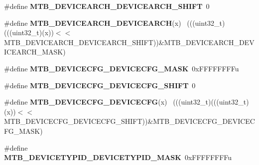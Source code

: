 \begin{DoxyCompactItemize}
\item 
\hypertarget{group___m_t_b___register___masks_ga80261ce3e90659fbc1f5c9e2dd2867f8}{}\#define {\bfseries M\+T\+B\+\_\+\+D\+E\+V\+I\+C\+E\+A\+R\+C\+H\+\_\+\+D\+E\+V\+I\+C\+E\+A\+R\+C\+H\+\_\+\+S\+H\+I\+F\+T}~0\label{group___m_t_b___register___masks_ga80261ce3e90659fbc1f5c9e2dd2867f8}

\item 
\hypertarget{group___m_t_b___register___masks_gaa0a369a22afd89955eb3635f56a1d7e4}{}\#define {\bfseries M\+T\+B\+\_\+\+D\+E\+V\+I\+C\+E\+A\+R\+C\+H\+\_\+\+D\+E\+V\+I\+C\+E\+A\+R\+C\+H}(x)                      ~(((uint32\+\_\+t)(((uint32\+\_\+t)(x))$<$$<$M\+T\+B\+\_\+\+D\+E\+V\+I\+C\+E\+A\+R\+C\+H\+\_\+\+D\+E\+V\+I\+C\+E\+A\+R\+C\+H\+\_\+\+S\+H\+I\+F\+T))\&M\+T\+B\+\_\+\+D\+E\+V\+I\+C\+E\+A\+R\+C\+H\+\_\+\+D\+E\+V\+I\+C\+E\+A\+R\+C\+H\+\_\+\+M\+A\+S\+K)\label{group___m_t_b___register___masks_gaa0a369a22afd89955eb3635f56a1d7e4}

\item 
\hypertarget{group___m_t_b___register___masks_ga5d8dec4596fd0f32f4b71f1fbfb71aee}{}\#define {\bfseries M\+T\+B\+\_\+\+D\+E\+V\+I\+C\+E\+C\+F\+G\+\_\+\+D\+E\+V\+I\+C\+E\+C\+F\+G\+\_\+\+M\+A\+S\+K}~0x\+F\+F\+F\+F\+F\+F\+F\+Fu\label{group___m_t_b___register___masks_ga5d8dec4596fd0f32f4b71f1fbfb71aee}

\item 
\hypertarget{group___m_t_b___register___masks_gac42900c87a48c38d0b310cbeb8781c81}{}\#define {\bfseries M\+T\+B\+\_\+\+D\+E\+V\+I\+C\+E\+C\+F\+G\+\_\+\+D\+E\+V\+I\+C\+E\+C\+F\+G\+\_\+\+S\+H\+I\+F\+T}~0\label{group___m_t_b___register___masks_gac42900c87a48c38d0b310cbeb8781c81}

\item 
\hypertarget{group___m_t_b___register___masks_ga10fd88b65b900c08c281f5a8aa886ddd}{}\#define {\bfseries M\+T\+B\+\_\+\+D\+E\+V\+I\+C\+E\+C\+F\+G\+\_\+\+D\+E\+V\+I\+C\+E\+C\+F\+G}(x)                          ~(((uint32\+\_\+t)(((uint32\+\_\+t)(x))$<$$<$M\+T\+B\+\_\+\+D\+E\+V\+I\+C\+E\+C\+F\+G\+\_\+\+D\+E\+V\+I\+C\+E\+C\+F\+G\+\_\+\+S\+H\+I\+F\+T))\&M\+T\+B\+\_\+\+D\+E\+V\+I\+C\+E\+C\+F\+G\+\_\+\+D\+E\+V\+I\+C\+E\+C\+F\+G\+\_\+\+M\+A\+S\+K)\label{group___m_t_b___register___masks_ga10fd88b65b900c08c281f5a8aa886ddd}

\item 
\hypertarget{group___m_t_b___register___masks_ga67e83a0bbb46ccb3456f83b4f1b39a86}{}\#define {\bfseries M\+T\+B\+\_\+\+D\+E\+V\+I\+C\+E\+T\+Y\+P\+I\+D\+\_\+\+D\+E\+V\+I\+C\+E\+T\+Y\+P\+I\+D\+\_\+\+M\+A\+S\+K}~0x\+F\+F\+F\+F\+F\+F\+F\+Fu\label{group___m_t_b___register___masks_ga67e83a0bbb46ccb3456f83b4f1b39a86}


\end{DoxyCompactItemize}
